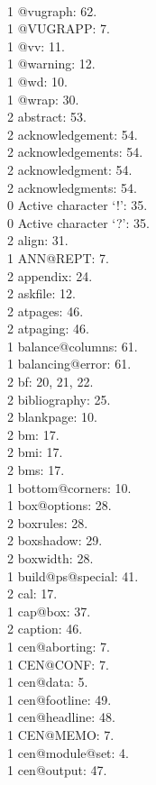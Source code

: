 \\1 @vugraph: 62.
\\1 @VUGRAPP: 7.
\\1 @vv: 11.
\\1 @warning: 12.
\\1 @wd: 10.
\\1 @wrap: 30.
\\2 abstract: 53.
\\2 acknowledgement: 54.
\\2 acknowledgements: 54.
\\2 acknowledgment: 54.
\\2 acknowledgments: 54.
\\0 Active character `!': 35.
\\0 Active character `?': 35.
\\2 align: 31.
\\1 ANN@REPT: 7.
\\2 appendix: 24.
\\2 askfile: 12.
\\2 atpages: 46.
\\2 atpaging: 46.
\\1 balance@columns: 61.
\\1 balancing@error: 61.
\\2 bf: 20, 21, 22.
\\2 bibliography: 25.
\\2 blankpage: 10.
\\2 bm: 17.
\\2 bmi: 17.
\\2 bms: 17.
\\1 bottom@corners: 10.
\\1 box@options: 28.
\\2 boxrules: 28.
\\2 boxshadow: 29.
\\2 boxwidth: 28.
\\1 build@ps@special: 41.
\\2 cal: 17.
\\1 cap@box: 37.
\\2 caption: 46.
\\1 cen@aborting: 7.
\\1 CEN@CONF: 7.
\\1 cen@data: 5.
\\1 cen@footline: 49.
\\1 cen@headline: 48.
\\1 CEN@MEMO: 7.
\\1 cen@module@set: 4.
\\1 cen@output: 47.
